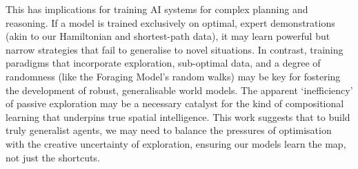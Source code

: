 This has implications for training AI systems for complex planning and reasoning. If a model is trained exclusively on optimal, expert demonstrations (akin to our Hamiltonian and shortest-path data), it may learn powerful but narrow strategies that fail to generalise to novel situations. In contrast, training paradigms that incorporate exploration, sub-optimal data, and a degree of randomness (like the Foraging Model's random walks) may be key for fostering the development of robust, generalisable world models. The apparent `inefficiency' of passive exploration may be a necessary catalyst for the kind of compositional learning that underpins true spatial intelligence. This work suggests that to build truly generalist agents, we may need to balance the pressures of optimisation with the creative uncertainty of exploration, ensuring our models learn the map, not just the shortcuts.